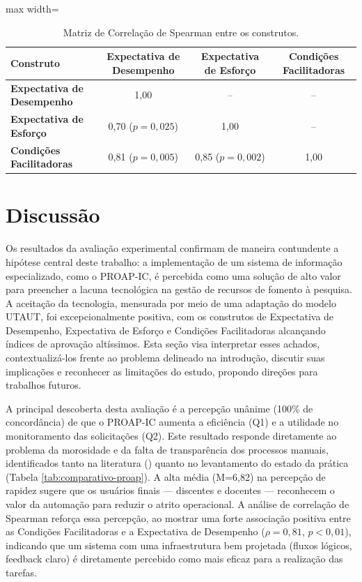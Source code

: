 \documentclass[portuguese]{sbc2025}%
\begin{document}
\begin{table}[hbt]
    \centering
    \caption{Matriz de Correlação de Spearman entre os construtos.}
    \label{tab:correlacao-spearman}
    \begin{adjustbox}{max width=\textwidth}
        \begin{tabular}{|l|c|c|c|}
            \hline
            \textbf{Construto} & \textbf{Expectativa de Desempenho} & \textbf{Expectativa de Esforço} & \textbf{Condições Facilitadoras} \\
            \hline
            \textbf{Expectativa de Desempenho} & 1{,}00 & -- & -- \\
            \textbf{Expectativa de Esforço}    & 0{,}70 ($p=0{,}025$) & 1{,}00 & -- \\
            \textbf{Condições Facilitadoras}   & 0{,}81 ($p=0{,}005$) & 0{,}85 ($p=0{,}002$) & 1{,}00 \\
            \hline
        \end{tabular}
    \end{adjustbox}
\end{table}

\section{Discussão}
\label{sec:discussao}

Os resultados da avaliação experimental confirmam de maneira contundente a hipótese central deste trabalho: a implementação de um sistema de informação especializado, como o PROAP-IC, é percebida como uma solução de alto valor para preencher a lacuna tecnológica na gestão de recursos de fomento à pesquisa. A aceitação da tecnologia, mensurada por meio de uma adaptação do modelo UTAUT, foi excepcionalmente positiva, com os construtos de Expectativa de Desempenho, Expectativa de Esforço e Condições Facilitadoras alcançando índices de aprovação altíssimos. Esta seção visa interpretar esses achados, contextualizá-los frente ao problema delineado na introdução, discutir suas implicações e reconhecer as limitações do estudo, propondo direções para trabalhos futuros.

A principal descoberta desta avaliação é a percepção unânime (100\% de concordância) de que o PROAP-IC aumenta a eficiência (Q1) e a utilidade no monitoramento das solicitações (Q2). Este resultado responde diretamente ao problema da morosidade e da falta de transparência dos processos manuais, identificados tanto na literatura (\cite{freitas2016analise}) quanto no levantamento do estado da prática (Tabela \ref{tab:comparativo-proap}). A alta média (M=6,82) na percepção de rapidez sugere que os usuários finais — discentes e docentes — reconhecem o valor da automação para reduzir o atrito operacional. A análise de correlação de Spearman reforça essa percepção, ao mostrar uma forte associação positiva entre as Condições Facilitadoras e a Expectativa de Desempenho ($\rho=0,81$, $p<0,01$), indicando que um sistema com uma infraestrutura bem projetada (fluxos lógicos, feedback claro) é diretamente percebido como mais eficaz para a realização das tarefas.
\end{document}
